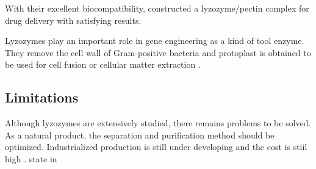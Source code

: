 With their excellent biocompatibility, \citet{Lin2015} constructed a lyzozyme/pectin complex for drug delivery with satisfying results.

Lyzozymes play an important role in gene engineering as a kind of tool enzyme. They remove the cell wall of Gram-positive bacteria and protoplast is obtained to be used for cell fusion or cellular  matter extraction \citep{Yu-tong2006}.

\subsection{Limitations}
Although lyzozymes are extensively studied, there remains problems to be solved. As a natural product, the separation and purification method should be optimized. Industrialized production is still under developing and the cost is stiil high \citet{ZHAI2015}. \citet{Zhao2009} state in 








